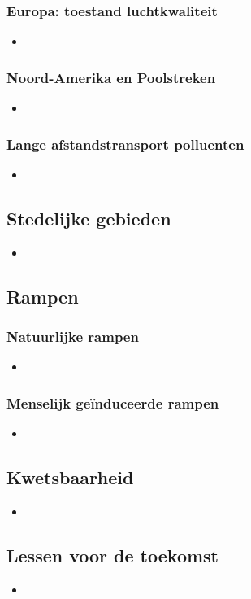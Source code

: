 \documentclass[12pt]{article}
\begin{document}
    \subsubsection*{Europa: toestand luchtkwaliteit}
    \begin{itemize}
        \item 
    \end{itemize}

    \subsubsection*{Noord-Amerika en Poolstreken}
    \begin{itemize}
        \item 
    \end{itemize}

    \subsubsection*{Lange afstandstransport polluenten}
    \begin{itemize}
        \item 
    \end{itemize}

    
    \subsection{Stedelijke gebieden}
    \begin{itemize}
        \item 
    \end{itemize}


    \subsection{Rampen}
    \subsubsection*{Natuurlijke rampen}
    \begin{itemize}
        \item 
    \end{itemize}

    \subsubsection*{Menselijk geïnduceerde rampen}
    \begin{itemize}
        \item 
    \end{itemize}


    \subsection{Kwetsbaarheid}
    \begin{itemize}
        \item 
    \end{itemize}


    \subsection{Lessen voor de toekomst}
    \begin{itemize}
        \item 
    \end{itemize}
\end{document}
